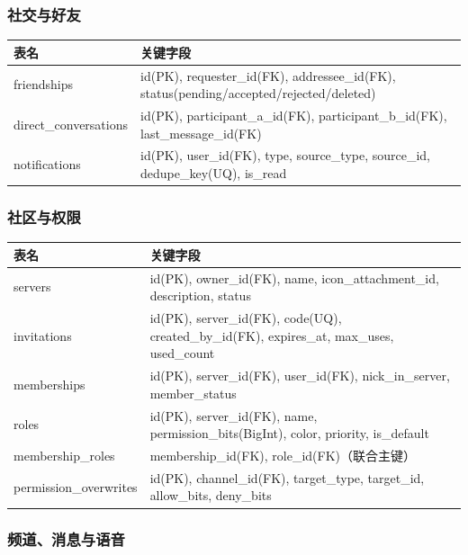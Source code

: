 \subsubsection{社交与好友}

\noindent\begin{tabularx}{\textwidth}{L{3.2cm}Y}
\toprule
\textbf{表名} & \textbf{关键字段} \\
\midrule
friendships & id(PK), requester\_id(FK), addressee\_id(FK), status(pending/accepted/rejected/deleted) \\
direct\_conversations & id(PK), participant\_a\_id(FK), participant\_b\_id(FK), last\_message\_id(FK) \\
notifications & id(PK), user\_id(FK), type, source\_type, source\_id, dedupe\_key(UQ), is\_read \\
\bottomrule
\end{tabularx}

\subsubsection{社区与权限}

\noindent\begin{tabularx}{\textwidth}{L{3.2cm}Y}
\toprule
\textbf{表名} & \textbf{关键字段} \\
\midrule
servers & id(PK), owner\_id(FK), name, icon\_attachment\_id, description, status \\
invitations & id(PK), server\_id(FK), code(UQ), created\_by\_id(FK), expires\_at, max\_uses, used\_count \\
memberships & id(PK), server\_id(FK), user\_id(FK), nick\_in\_server, member\_status \\
roles & id(PK), server\_id(FK), name, permission\_bits(BigInt), color, priority, is\_default \\
membership\_roles & membership\_id(FK), role\_id(FK)（联合主键）\\
permission\_overwrites & id(PK), channel\_id(FK), target\_type, target\_id, allow\_bits, deny\_bits \\
\bottomrule
\end{tabularx}

\subsubsection{频道、消息与语音}

